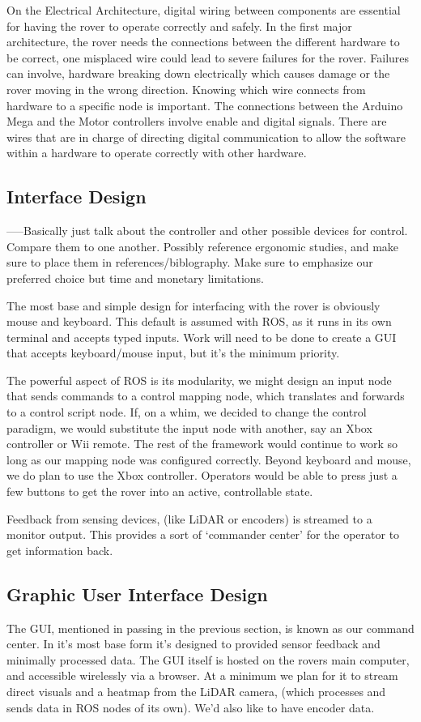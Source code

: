 \documentclass[a4paper, 10pt]{article}
\begin{document}
	On the Electrical Architecture, digital wiring between components are essential for having the rover to operate correctly and safely. In the first major architecture, the rover needs the connections between the different hardware to be correct, one misplaced wire could lead to severe failures for the rover. Failures can involve, hardware breaking down electrically which causes damage or the rover moving in the wrong direction. Knowing which wire connects from hardware to a specific node is important. The connections between the Arduino Mega and the Motor controllers involve enable and digital signals. There are wires that are in charge of directing digital communication to allow the software within a hardware to operate correctly with other hardware. 

	\subsection{Interface Design}
	-----Basically just talk about the controller and other possible devices for control. Compare them to one another. Possibly reference ergonomic studies, and make sure to place them in references/biblography. Make sure to emphasize our preferred choice but time and monetary limitations.
	
	The most base and simple design for interfacing with the rover is obviously mouse and keyboard. This default is assumed with ROS, as it runs in its own terminal and accepts typed inputs. Work will need to be done to create a GUI that accepts keyboard/mouse input, but it's the minimum priority.
	
	The powerful aspect of ROS is its modularity, we might design an input node that sends commands to a control mapping node, which translates and forwards to a control script node. If, on a whim, we decided to change the control paradigm, we would substitute the input node with another, say an Xbox controller or Wii remote. The rest of the framework would continue to work so long as our mapping node was configured correctly. Beyond keyboard and mouse, we do plan to use the Xbox controller. Operators would be able to press just a few buttons to get the rover into an active, controllable state.
	
	Feedback from sensing devices, (like LiDAR or encoders) is streamed to a monitor output. This provides a sort of `commander center' for the operator to get information back.

	\subsection{Graphic User Interface Design}
	The GUI, mentioned in passing in the previous section, is known as our command center. In it's most base form it's designed to provided sensor feedback and minimally processed data. The GUI itself is hosted on the rovers main computer, and accessible wirelessly via a browser. At a minimum we plan for it to stream direct visuals and a heatmap from the LiDAR camera, (which processes and sends data in ROS nodes of its own). We'd also like to have encoder data. 
	
\end{document}
